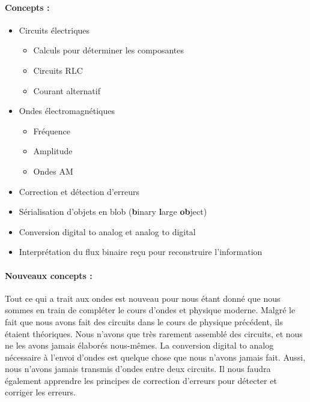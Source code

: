 \paragraph{Concepts :}
\begin{itemize}
    \item Circuits électriques
    \begin{itemize}
        \item Calculs pour déterminer les composantes
        \item Circuits RLC
        \item Courant alternatif
    \end{itemize}
    \item Ondes électromagnétiques
    \begin{itemize}
        \item Fréquence 
        \item Amplitude
        \item Ondes AM 
    \end{itemize}
    \item Correction et détection d'erreurs
    \item Sérialisation d'objets en blob (\textbf{b}inary \textbf{l}arge \textbf{ob}ject)
    \item Conversion digital to analog et analog to digital
    \item Interprétation du flux binaire reçu pour reconstruire l'information
\end{itemize}

\paragraph{Nouveaux concepts :}
Tout ce qui a trait aux ondes est nouveau pour nous étant donné que nous sommes en train de compléter le cours d'ondes et physique moderne.
Malgré le fait que nous avons fait des circuits dans le cours de physique précédent, ils étaient théoriques.
Nous n'avons que très rarement assemblé des circuits, et nous ne les avons jamais élaborés nous-mêmes.
La conversion digital to analog nécessaire à l'envoi d'ondes est quelque chose que nous n'avons jamais fait.
Aussi, nous n'avons jamais transmis d'ondes entre deux circuits.
Il nous faudra également apprendre les principes de correction d'erreurs pour détecter et corriger les erreurs.

